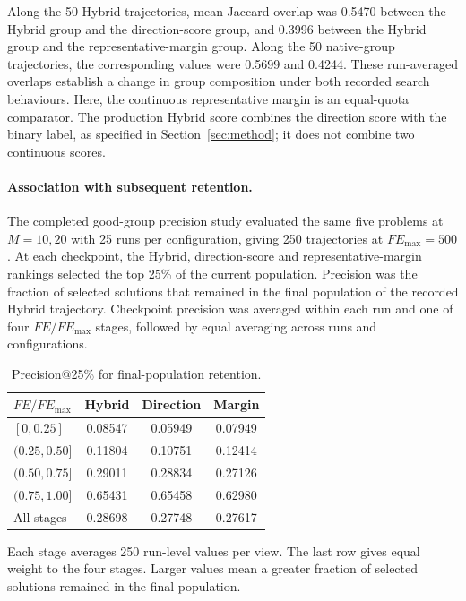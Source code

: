\documentclass[final,5p,times,twocolumn]{elsarticle}
\begin{document}
Along the 50 Hybrid trajectories, mean Jaccard overlap was 0.5470 between
the Hybrid group and the direction-score group, and 0.3996 between the
Hybrid group and the representative-margin group. Along the 50
native-group trajectories, the corresponding values were 0.5699 and
0.4244. These run-averaged overlaps establish a change in group
composition under both recorded search behaviours. Here, the continuous
representative margin is an equal-quota comparator. The production
Hybrid score combines the direction score with the binary label, as
specified in Section~\ref{sec:method}; it does not combine two continuous
scores.

\paragraph{Association with subsequent retention.}
The completed good-group precision study evaluated the same five
problems at $M=10,20$ with 25 runs per configuration, giving 250
trajectories at $FE_{\max}=500$. At each checkpoint, the Hybrid,
direction-score and representative-margin rankings selected the top
25\% of the current population. Precision was the fraction of selected
solutions that remained in the final population of the recorded Hybrid
trajectory. Checkpoint precision was averaged within each run and one
of four $FE/FE_{\max}$ stages, followed by equal averaging across runs
and configurations.

\begin{table}[t]
\centering
\caption{Precision@25\% for final-population retention.}
\label{tab:exp:precision}
\footnotesize
\setlength{\tabcolsep}{3pt}
\renewcommand{\arraystretch}{1.12}
\begin{tabular}{lccc}
\toprule
$FE/FE_{\max}$ & Hybrid & Direction & Margin \\
\midrule
$[0,0.25]$ & 0.08547 & 0.05949 & 0.07949 \\
$(0.25,0.50]$ & 0.11804 & 0.10751 & 0.12414 \\
$(0.50,0.75]$ & 0.29011 & 0.28834 & 0.27126 \\
$(0.75,1.00]$ & 0.65431 & 0.65458 & 0.62980 \\
\midrule
All stages & 0.28698 & 0.27748 & 0.27617 \\
\bottomrule
\end{tabular}
\par\smallskip
\begin{minipage}{\linewidth}
\scriptsize Each stage averages 250 run-level values per view. The last row gives equal weight to the four stages. Larger values mean a greater fraction of selected solutions remained in the final population.
\end{minipage}
\end{table}
\end{document}
